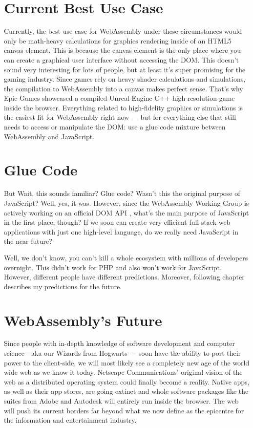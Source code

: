 \documentclass[10pt]{article}  %
\begin{document}
\begin{sloppypar}
  \section{Current Best Use Case}
  \label{sec:use-cases}

  Currently, the best use case for WebAssembly under these circumstances would only be math-heavy calculations for graphics rendering inside of an HTML5 canvas element. This is because the canvas element is the only place where you can create a graphical user interface without accessing the DOM. This doesn’t sound very interesting for lots of people, but at least it’s super promising for the gaming industry. Since games rely on heavy shader calculations and simulations, the compilation to WebAssembly into a canvas makes perfect sense. That’s why Epic Games showcased a compiled Unreal Engine C++ high-resolution game inside the browser. Everything related to high-fidelity graphics or simulations is the easiest fit for WebAssembly right now — but for everything else that still needs to access or manipulate the DOM: use a glue code mixture between WebAssembly and JavaScript.

  \section{Glue Code}
  \label{sec:glue-code}

  But Wait, this sounds familiar? Glue code? Wasn’t this the original purpose of JavaScript? Well, yes, it was. However, since the WebAssembly Working Group is actively working on an official DOM API \citep{mozilla_webassemblymodule_2023}, what’s the main purpose of JavaScript in the first place, though? If we soon can create very efficient full-stack web applications with just one high-level language, do we really need JavaScript in the near future?

  Well, we don’t know, you can’t kill a whole ecosystem with millions of developers overnight. This didn’t work for PHP and also won’t work for JavaScript. However, different people have different predictions. Moreover, following chapter describes my predictions for the future.

  \section{WebAssembly's Future}
  \label{sec:webassembly-future}

  Since people with in-depth knowledge of software development and computer science—aka our Wizards from Hogwarts — soon have the ability to port their power to the client-side, we will most likely see a completely new age of the world wide web as we know it today. Netscape Communications’ original vision of the web as a distributed operating system could finally become a reality. Native apps, as well as their app stores, are going extinct and whole software packages like the suites from Adobe and Autodesk will entirely run inside the browser. The web will push its current borders far beyond what we now define as the epicentre for the information and entertainment industry.


\end{sloppypar}
\end{document}
